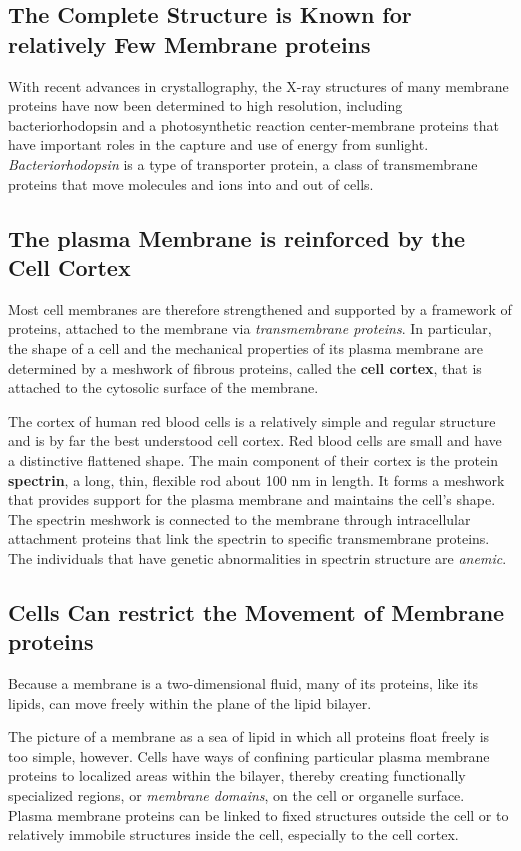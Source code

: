 \subsection{The Complete Structure is Known for relatively Few Membrane proteins}

With recent advances in crystallography, the X-ray structures of many membrane
proteins have now been determined to high resolution, including
bacteriorhodopsin and a photosynthetic reaction center-membrane proteins
that have important roles in the capture and use of energy from sunlight.
\textit{Bacteriorhodopsin} is a type of transporter protein, a class of
transmembrane proteins that move molecules and ions into and out of
cells.

\subsection{The plasma Membrane is reinforced by the Cell Cortex}

Most cell membranes are therefore strengthened
and supported by a framework of proteins, attached to the membrane
via \textit{transmembrane proteins}. In particular, the shape of a cell and the
mechanical properties of its plasma membrane are determined by a
meshwork of fibrous proteins, called the \textbf{cell cortex}, that is attached to the
cytosolic surface of the membrane.

The cortex of human red blood cells is a relatively simple and regular
structure and is by far the best understood cell cortex. Red blood cells
are small and have a distinctive flattened shape.
The main
component of their cortex is the protein \textbf{spectrin}, a long, thin, flexible
rod about 100 nm in length. It forms a meshwork that provides support
for the plasma membrane and maintains the cell’s shape. The spectrin
meshwork is connected to the membrane through intracellular attachment
proteins that link the spectrin to specific transmembrane proteins.
The individuals that have genetic abnormalities in spectrin structure are \textit{anemic}.

\subsection{Cells Can restrict the Movement of Membrane proteins}

Because a membrane is a two-dimensional fluid, many of its proteins, like
its lipids, can move freely within the plane of the lipid bilayer.

The picture of a membrane as a sea of lipid in which all proteins float
freely is too simple, however. Cells have ways of confining particular
plasma membrane proteins to localized areas within the bilayer, thereby
creating functionally specialized regions, or \textit{membrane domains}, on the
cell or organelle surface.
Plasma membrane proteins can be linked to fixed structures outside the cell
or to relatively immobile structures inside the cell, especially to the cell cortex.

